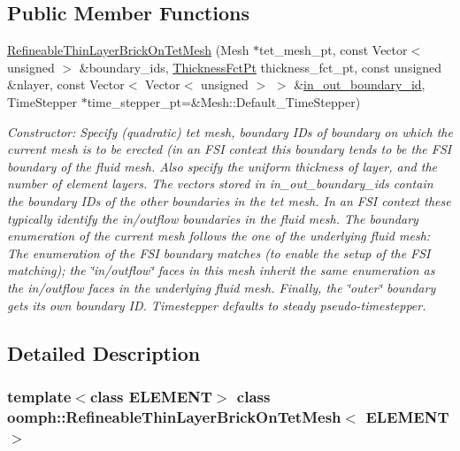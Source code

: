 \subsection*{Public Member Functions}
\begin{DoxyCompactItemize}
\item 
\hyperlink{classoomph_1_1RefineableThinLayerBrickOnTetMesh_a3f1a8807362ae98ae73bbf577e858e51}{Refineable\+Thin\+Layer\+Brick\+On\+Tet\+Mesh} (Mesh $\ast$tet\+\_\+mesh\+\_\+pt, const Vector$<$ unsigned $>$ \&boundary\+\_\+ids, \hyperlink{classoomph_1_1RefineableThinLayerBrickOnTetMesh_a744583cb70486874441d5a748f23168d}{Thickness\+Fct\+Pt} thickness\+\_\+fct\+\_\+pt, const unsigned \&nlayer, const Vector$<$ Vector$<$ unsigned $>$ $>$ \&\hyperlink{classoomph_1_1ThinLayerBrickOnTetMesh_a3cfd55eb5bbd6801e9d4cd271e602cd8}{in\+\_\+out\+\_\+boundary\+\_\+id}, Time\+Stepper $\ast$time\+\_\+stepper\+\_\+pt=\&Mesh\+::\+Default\+\_\+\+Time\+Stepper)
\begin{DoxyCompactList}\small\item\em Constructor\+: Specify (quadratic) tet mesh, boundary I\+Ds of boundary on which the current mesh is to be erected (in an F\+SI context this boundary tends to be the F\+SI boundary of the fluid mesh. Also specify the uniform thickness of layer, and the number of element layers. The vectors stored in in\+\_\+out\+\_\+boundary\+\_\+ids contain the boundary I\+Ds of the other boundaries in the tet mesh. In an F\+SI context these typically identify the in/outflow boundaries in the fluid mesh. The boundary enumeration of the current mesh follows the one of the underlying fluid mesh\+: The enumeration of the F\+SI boundary matches (to enable the setup of the F\+SI matching); the \char`\"{}in/outflow\char`\"{} faces in this mesh inherit the same enumeration as the in/outflow faces in the underlying fluid mesh. Finally, the \char`\"{}outer\char`\"{} boundary gets its own boundary ID. Timestepper defaults to steady pseudo-\/timestepper. \end{DoxyCompactList}\end{DoxyCompactItemize}


\subsection{Detailed Description}
\subsubsection*{template$<$class E\+L\+E\+M\+E\+NT$>$\newline
class oomph\+::\+Refineable\+Thin\+Layer\+Brick\+On\+Tet\+Mesh$<$ E\+L\+E\+M\+E\+N\+T $>$}

